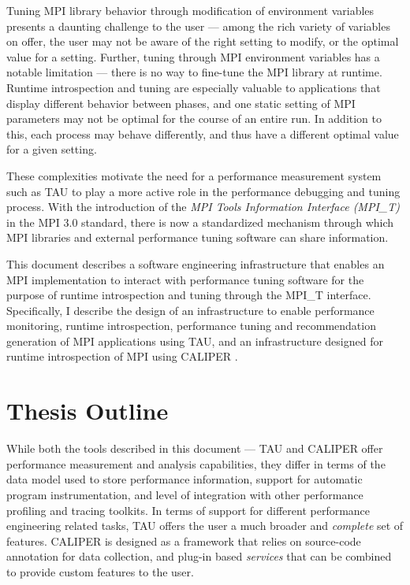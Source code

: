 Tuning MPI library behavior through modification of environment variables presents a daunting challenge to the user --- among the rich variety of variables on offer, the user may not be aware of the right setting to modify, or the optimal value for a setting. Further, tuning through MPI environment variables has a notable limitation --- there is no way to fine-tune the MPI library at runtime. Runtime introspection and tuning are especially valuable to applications that display different behavior between phases, and one static setting of MPI parameters may not be optimal for the course of an entire run. In addition to this, each process may behave differently, and thus have a different optimal value for a given setting. \par
These complexities motivate the need for a performance measurement system such as TAU to play a more active role in the performance debugging and tuning process. With the introduction of the \textit{MPI Tools Information Interface (MPI\_T)} in the MPI 3.0 standard, there is now a standardized mechanism through which MPI libraries and external performance tuning software can share information. 
\par This document describes a software engineering infrastructure that enables an MPI implementation to interact with performance tuning software for the purpose of runtime introspection and tuning through the MPI\_T interface. Specifically, I describe the design of an infrastructure to enable performance monitoring, runtime introspection, performance tuning and recommendation generation of MPI applications using TAU, and an infrastructure designed for runtime introspection of MPI using CALIPER \cite{CALIPER}.

\section {Thesis Outline}
While both the tools described in this document --- TAU and CALIPER offer performance measurement and analysis capabilities, they differ in terms of the data model used to store performance information, support for automatic program instrumentation, and level of integration with other performance profiling and tracing toolkits. In terms of support for different performance engineering related tasks, TAU offers the user a much broader and \textit{complete} set of features. CALIPER is designed as a framework that relies on source-code annotation for data collection, and plug-in based \textit{services} that can be combined to provide custom features to the user.

